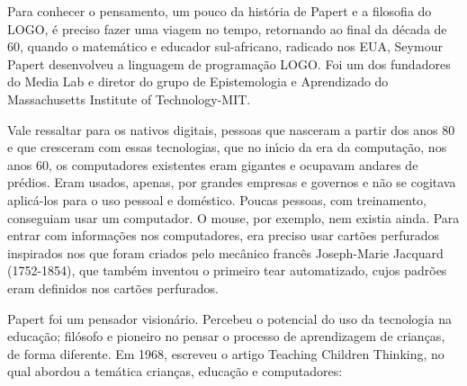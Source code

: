 \documentclass[
12pt,		%
openright,	%
twoside,  %
a4paper,			%
chapter=TITLE,		%
english,			%
french,				%
spanish,			%
brazil				%
]{USPSC-classe/USPSC}
\begin{document}
Para conhecer  o pensamento, um pouco da hist\'oria de Papert e  a filosofia do LOGO, \'e preciso fazer uma viagem no tempo, retornando ao final da d\'ecada de 60, quando o matem\'atico e educador sul-africano, radicado nos EUA, Seymour Papert desenvolveu a linguagem   de programa\c{c}\~ao LOGO.  Foi um dos fundadores do Media Lab e diretor do grupo de Epistemologia e Aprendizado do Massachusetts Institute of Technology-MIT.










Vale ressaltar para os nativos digitais, pessoas que nasceram a partir dos anos 80 e que cresceram com essas tecnologias, que no in\'{\i}cio da era da computa\c{c}\~ao, nos anos 60, os computadores existentes eram gigantes e ocupavam andares de pr\'edios. Eram usados, apenas, por grandes empresas e governos e n\~ao se cogitava aplic\'a-los para o uso pessoal e dom\'estico. Poucas pessoas, com treinamento, conseguiam usar um computador. O mouse, por exemplo, nem existia ainda. Para entrar com informa\c{c}\~oes nos computadores, era preciso usar cart\~oes perfurados inspirados nos que foram criados pelo mec\^anico franc\^es Joseph-Marie Jacquard (1752-1854), que tamb\'em inventou o primeiro tear automatizado, cujos padr\~oes eram definidos nos cart\~oes perfurados.










Papert foi um pensador vision\'ario. Percebeu o potencial do uso da tecnologia na educa\c{c}\~ao; fil\'osofo e pioneiro no pensar o processo de aprendizagem de crian\c{c}as, de forma diferente. Em 1968, escreveu o artigo \textquotedbl Teaching Children Thinking\textquotedbl , no qual abordou a tem\'atica crian\c{c}as, educa\c{c}\~ao e computadores:











\noindent\begin{center}\mbox{\centering{}}\end{center}
\end{document}
